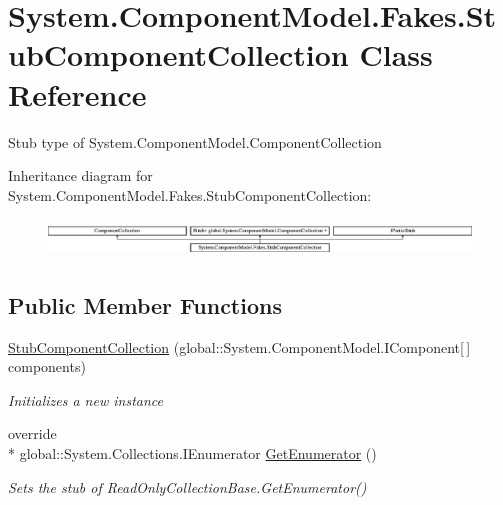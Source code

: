 \hypertarget{class_system_1_1_component_model_1_1_fakes_1_1_stub_component_collection}{\section{System.\-Component\-Model.\-Fakes.\-Stub\-Component\-Collection Class Reference}
\label{class_system_1_1_component_model_1_1_fakes_1_1_stub_component_collection}
}


Stub type of System.\-Component\-Model.\-Component\-Collection 


Inheritance diagram for System.\-Component\-Model.\-Fakes.\-Stub\-Component\-Collection\-:\begin{figure}[H]
\begin{center}
\leavevmode
\includegraphics[height=0.995556cm]{class_system_1_1_component_model_1_1_fakes_1_1_stub_component_collection}
\end{center}
\end{figure}
\subsection*{Public Member Functions}
\begin{DoxyCompactItemize}
\item 
\hyperlink{class_system_1_1_component_model_1_1_fakes_1_1_stub_component_collection_a7caffd73574b3b491a660389718f4e62}{Stub\-Component\-Collection} (global\-::\-System.\-Component\-Model.\-I\-Component\mbox{[}$\,$\mbox{]} components)
\begin{DoxyCompactList}\small\item\em Initializes a new instance\end{DoxyCompactList}\item 
override \\*
global\-::\-System.\-Collections.\-I\-Enumerator \hyperlink{class_system_1_1_component_model_1_1_fakes_1_1_stub_component_collection_a44debf763685bf51f239a3e9ce48e97d}{Get\-Enumerator} ()
\begin{DoxyCompactList}\small\item\em Sets the stub of Read\-Only\-Collection\-Base.\-Get\-Enumerator()\end{DoxyCompactList}\end{DoxyCompactItemize}
